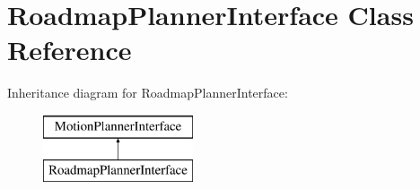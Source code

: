 \section{Roadmap\+Planner\+Interface Class Reference}
\label{classRoadmapPlannerInterface}
Inheritance diagram for Roadmap\+Planner\+Interface\+:\begin{figure}[H]
\begin{center}
\leavevmode
\includegraphics[height=2.000000cm]{classRoadmapPlannerInterface}
\end{center}
\end{figure}
